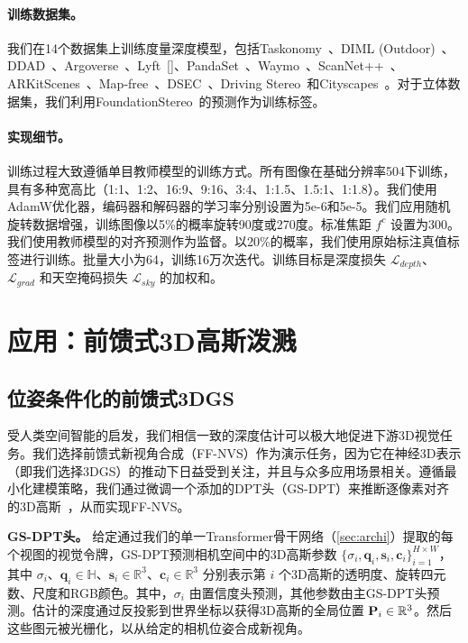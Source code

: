 \paragraph{训练数据集。}
我们在14个数据集上训练度量深度模型，包括Taskonomy~\cite{zamir2018taskonomy}、DIML (Outdoor)~\cite{cho2021diml}、DDAD~\cite{ddad}、Argoverse~\cite{wilson2023argoverse}、Lyft~[]、PandaSet~\cite{xiao2021pandaset}、Waymo~\cite{Sun_2020_CVPR}、ScanNet++~\cite{yeshwanth2023scannet++}、ARKitScenes~\cite{baruch2021arkitscenes}、Map-free~\cite{arnold2022map}、DSEC~\cite{Gehrig21ral}、Driving Stereo~\cite{yang2019drivingstereo}和Cityscapes~\cite{cordts2016cityscapes}。对于立体数据集，我们利用FoundationStereo~\cite{wen2025foundationstereo}的预测作为训练标签。

\paragraph{实现细节。}
训练过程大致遵循单目教师模型的训练方式。所有图像在基础分辨率504下训练，具有多种宽高比（1:1、1:2、16:9、9:16、3:4、1:1.5、1.5:1、1:1.8）。我们使用AdamW优化器，编码器和解码器的学习率分别设置为5e-6和5e-5。我们应用随机旋转数据增强，训练图像以5\%的概率旋转90度或270度。标准焦距 $f^c$ 设置为300。我们使用教师模型的对齐预测作为监督。以20\%的概率，我们使用原始标注真值标签进行训练。批量大小为64，训练16万次迭代。训练目标是深度损失 $\mathcal{L}_{depth}$、$\mathcal{L}_{grad}$ 和天空掩码损失 $\mathcal{L}_{sky}$ 的加权和。


\section{应用：前馈式3D高斯泼溅}
\subsection{位姿条件化的前馈式3DGS}
受人类空间智能的启发，我们相信一致的深度估计可以极大地促进下游3D视觉任务。我们选择前馈式新视角合成（FF-NVS）作为演示任务，因为它在神经3D表示（即我们选择3DGS）的推动下日益受到关注，并且与众多应用场景相关。遵循最小化建模策略，我们通过微调一个添加的DPT头（GS-DPT）来推断逐像素对齐的3D高斯~\cite{charatan2024pixelsplat,chen2024mvsplat}，从而实现FF-NVS。

\textbf{GS-DPT头。}
给定通过我们的单一Transformer骨干网络（\cref{sec:archi}）提取的每个视图的视觉令牌，GS-DPT预测相机空间中的3D高斯参数 $\{ \sigma_i, \mathbf{q}_i, \mathbf{s}_i, \mathbf{c}_i \}_{i=1}^{H \times W} $，其中 $\sigma_i$、$\mathbf{q}_i \in \mathbb{H}$、$\mathbf{s}_i \in \mathbb{R}^3$、$\mathbf{c}_i \in \mathbb{R}^3$ 分别表示第 $i$ 个3D高斯的透明度、旋转四元数、尺度和RGB颜色。其中，$\sigma_i$ 由置信度头预测，其他参数由主GS-DPT头预测。估计的深度通过反投影到世界坐标以获得3D高斯的全局位置 ${\mathbf{P}}_i \in \mathbb{R}^3 $。然后这些图元被光栅化，以从给定的相机位姿合成新视角。

